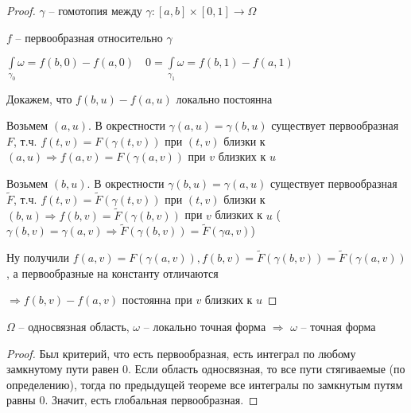 \begin{proof}\thmslashn
	
	$\gamma$ -- гомотопия между $\gamma : [a, b]\times [0, 1] \to \Omega$
	
	$f$ -- первообразная относительно $\gamma$ 
	
	$\int\limits_{\gamma_0} \omega = f(b, 0) - f(a, 0) \quad 0 =  \int\limits_{\gamma_1} \omega = f(b, 1) - f(a, 1)$
	
	Докажем, что $f(b, u) - f(a, u)$ локально постоянна
	
	Возьмем $(a, u)$. В окрестности $\gamma(a, u) = \gamma(b, u)$ существует первообразная $F$, т.ч. $f(t, v) = F(\gamma(t, v))$ при $(t, v)$ близки к $(a, u) \Rightarrow f(a,v) = F(\gamma(a, v))$ при $v$ близких к $u$ 
	
    Возьмем $(b, u)$. В окрестности $\gamma(b, u) = \gamma(a, u)$ существует первообразная $\tilde{F}$, т.ч. $f(t, v) = \tilde{F}(\gamma(t, v))$ при $(t, v)$ близки к $(b, u) \Rightarrow f(b,v) = \tilde{F}(\gamma(b, v))$ при $v$ близких к $u$ ($\gamma(b, v) = \gamma(a, v) \Rightarrow \tilde{F}(\gamma(b, v)) = \tilde{F}(\gamma{a,v})$)

    Ну получили $f(a, v) = F(\gamma(a, v)), f(b, v) = \tilde{F}(\gamma(b, v)) = \tilde{F}(\gamma(a, v))$, а первообразные на константу отличаются
	
	$\Rightarrow f(b, v) - f(a, v)$ постоянна при $v$ близких к $u$
	
\end{proof}

\begin{theorem}\thmslashn
	
	$\Omega$ -- односвязная область, $\omega$ -- локально точная форма $\Rightarrow$ $\omega$ -- точная форма	
\end{theorem}


\begin{proof}\thmslashn
	
    Был критерий, что есть первообразная, есть интеграл по любому замкнутому пути равен 0. Если область односвязная, то все пути стягиваемые (по определению), тогда по предыдущей теореме все интегралы по замкнутым путям равны 0. Значит, есть глобальная первообразная.
\end{proof}